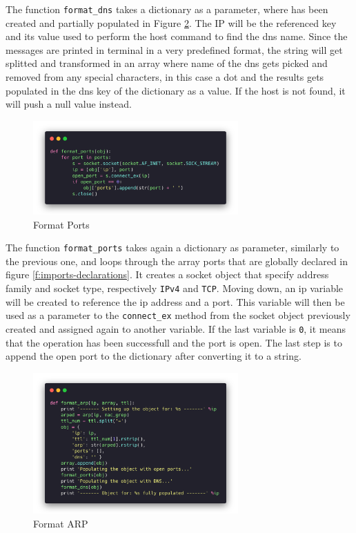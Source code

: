 The function \lstinline{format_dns} takes a dictionary as a parameter, where has
been created and partially populated in Figure \ref{f:format-arp}. The IP will
be the referenced key and its value used to perform the host command to find the
dns name. Since the messages are printed in terminal in a very predefined format,
the string will get splitted and transformed in an array where name of the dns
gets picked and removed from any special characters, in this case a dot and the
results gets populated in the dns key of the dictionary as a value. If the host
is not found, it will push a null value instead.
\begin{figure}[H]
  \centering
  \includegraphics[width=0.7\textwidth]{figures/code/format-ports}
  \caption{Format Ports}
  \label{f:format-ports}
\end{figure}

The function \lstinline{format_ports} takes again a dictionary as parameter,
similarly to the previous one, and loops through the array ports that are
globally declared in figure \ref{f:imports-declarations}. It creates a socket
object that specify address family and socket type, respectively
\lstinline{IPv4} and \lstinline{TCP}. Moving down, an ip variable will be
created to reference the ip address and a port. This variable will then be used
as a parameter to the \lstinline{connect_ex} method from the socket object
previously created and assigned again to another variable. If the last variable
is \lstinline{0}, it means that the operation has been successfull and the port
is open. The last step is to append the open port to the dictionary after
converting it to a string.

\begin{figure}[H]
  \centering
  \includegraphics[width=0.7\textwidth]{figures/code/format-arp}
  \caption{Format ARP}
  \label{f:format-arp}
\end{figure}

